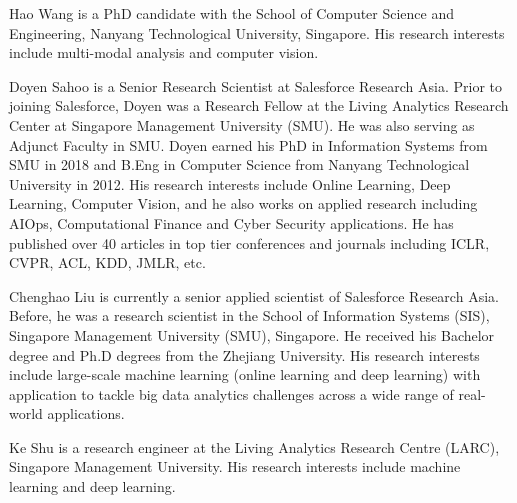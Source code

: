 \documentclass[journal]{IEEEtran}
\begin{document}












\newpage

\begin{IEEEbiography}{Hao Wang}
is a PhD candidate with the School of Computer Science and Engineering, Nanyang Technological University, Singapore. His research interests include multi-modal analysis and computer vision.
\end{IEEEbiography}

\begin{IEEEbiography}{Doyen Sahoo}
is a Senior Research Scientist at Salesforce Research Asia. Prior to joining Salesforce, Doyen was a Research Fellow at the Living Analytics Research Center at Singapore Management University (SMU). He was also serving as Adjunct Faculty in SMU. Doyen earned his PhD in Information Systems from SMU in 2018 and B.Eng in Computer Science from Nanyang Technological University in 2012. His research interests include Online Learning, Deep Learning, Computer Vision, and he also works on applied research including AIOps, Computational Finance and Cyber Security applications. He has published over 40 articles in top tier conferences and journals including ICLR, CVPR, ACL, KDD, JMLR, etc.
\end{IEEEbiography}

\begin{IEEEbiography}{Chenghao Liu}
is currently a senior applied scientist of Salesforce Research Asia. Before, he was a research scientist in the School of Information Systems (SIS), Singapore Management University (SMU), Singapore. He received his Bachelor degree and Ph.D degrees from the Zhejiang University. His research interests include large-scale machine learning (online learning and deep learning) with application to tackle big data analytics challenges across a wide range of real-world applications.
\end{IEEEbiography}

\begin{IEEEbiography}{Ke Shu}
is a research engineer at the Living Analytics Research Centre (LARC), Singapore Management University. His research interests include machine learning and deep learning.
\end{IEEEbiography}
\end{document}

